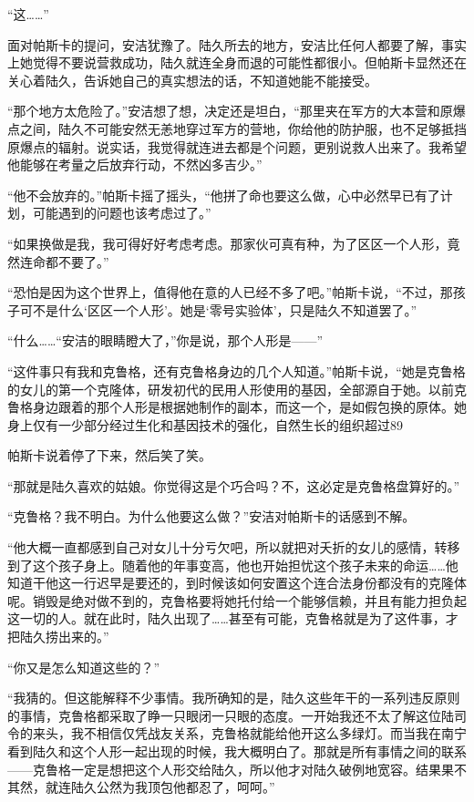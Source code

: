 “这……”

面对帕斯卡的提问，安洁犹豫了。陆久所去的地方，安洁比任何人都要了解，事实上她觉得不要说营救成功，陆久就连全身而退的可能性都很小。但帕斯卡显然还在关心着陆久，告诉她自己的真实想法的话，不知道她能不能接受。

“那个地方太危险了。”安洁想了想，决定还是坦白，“那里夹在军方的大本营和原爆点之间，陆久不可能安然无恙地穿过军方的营地，你给他的防护服，也不足够抵挡原爆点的辐射。说实话，我觉得就连进去都是个问题，更别说救人出来了。我希望他能够在考量之后放弃行动，不然凶多吉少。”

“他不会放弃的。”帕斯卡摇了摇头，“他拼了命也要这么做，心中必然早已有了计划，可能遇到的问题也该考虑过了。”

“如果换做是我，我可得好好考虑考虑。那家伙可真有种，为了区区一个人形，竟然连命都不要了。”

“恐怕是因为这个世界上，值得他在意的人已经不多了吧。”帕斯卡说，“不过，那孩子可不是什么‘区区一个人形’。她是‘零号实验体’，只是陆久不知道罢了。”

“什么……“安洁的眼睛瞪大了，”你是说，那个人形是——”

“这件事只有我和克鲁格，还有克鲁格身边的几个人知道。”帕斯卡说，“她是克鲁格的女儿的第一个克隆体，研发初代的民用人形使用的基因，全部源自于她。以前克鲁格身边跟着的那个人形是根据她制作的副本，而这一个，是如假包换的原体。她身上仅有一少部分经过生化和基因技术的强化，自然生长的组织超过89%

帕斯卡说着停了下来，然后笑了笑。

“那就是陆久喜欢的姑娘。你觉得这是个巧合吗？不，这必定是克鲁格盘算好的。”

“克鲁格？我不明白。为什么他要这么做？”安洁对帕斯卡的话感到不解。

“他大概一直都感到自己对女儿十分亏欠吧，所以就把对夭折的女儿的感情，转移到了这个孩子身上。随着他的年事变高，他也开始担忧这个孩子未来的命运……他知道干他这一行迟早是要还的，到时候该如何安置这个连合法身份都没有的克隆体呢。销毁是绝对做不到的，克鲁格要将她托付给一个能够信赖，并且有能力担负起这一切的人。就在此时，陆久出现了……甚至有可能，克鲁格就是为了这件事，才把陆久捞出来的。”

“你又是怎么知道这些的？”

“我猜的。但这能解释不少事情。我所确知的是，陆久这些年干的一系列违反原则的事情，克鲁格都采取了睁一只眼闭一只眼的态度。一开始我还不太了解这位陆司令的来头，我不相信仅凭战友关系，克鲁格就能给他开这么多绿灯。而当我在南宁看到陆久和这个人形一起出现的时候，我大概明白了。那就是所有事情之间的联系——克鲁格一定是想把这个人形交给陆久，所以他才对陆久破例地宽容。结果果不其然，就连陆久公然为我顶包他都忍了，呵呵。”

